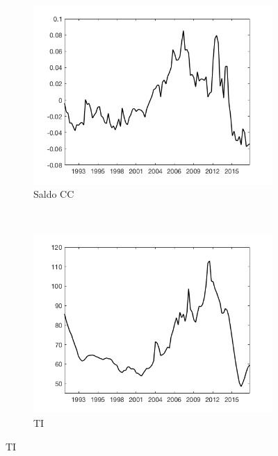 \documentclass{beamer}
\begin{document}
\begin{frame}
\begin{figure}
    ~ %
    \begin{subfigure}[b]{0.4\textwidth}
        \includegraphics[width=\textwidth]{fig9}
        \caption{\tiny Saldo CC}
    \end{subfigure}
    ~ %
   \begin{subfigure}[b]{0.4\textwidth}
       \includegraphics[width=\textwidth]{fig10}
        \caption{\tiny TI}
    \end{subfigure}
\end{figure}
\end{frame}
\end{document}
